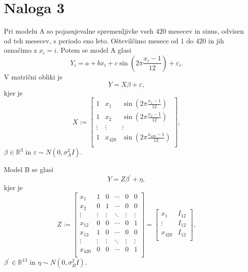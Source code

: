 \documentclass{article}
\begin{document}
\section*{Naloga 3}
Pri modelu A so pojasnjevalne spremenljivke vseh $420$ mesecev in sinus, odvisen od teh mesecev, s periodo eno leto. Oštevilčimo mesece od $1$ do $420$ in jih označimo z $x_i = i$. Potem se model A glasi
\begin{equation*}
    Y_i = a + b x_i + c \sin \left(2\pi \frac{x_i - 1}{12}\right) + \varepsilon_i.
\end{equation*}
V matrični obliki je
\begin{equation*}
    Y = X \beta + \varepsilon,
\end{equation*}
kjer je
\begin{equation*}
    X := 
    \begin{bmatrix}
        1 & x_1 & \sin \left(2\pi \frac{x_1 - 1}{12}\right) \\
        1 & x_2 & \sin \left(2\pi \frac{x_2 - 1}{12}\right) \\
        \vdots & \vdots & \vdots \\
        1 & x_{420} & \sin \left(2\pi \frac{x_{420} - 1}{12}\right) \\
    \end{bmatrix},
\end{equation*}
$\beta \in \mathbb{R}^3$ in $\varepsilon \sim N \left(0, \sigma_A^2 I\right)$.

Model B se glasi
\begin{equation*}
    Y = Z \beta^\prime + \eta,
\end{equation*}
kjer je
\begin{equation*}
    Z :=
    \begin{bmatrix}
        x_1 & 1 & 0 & \cdots & 0 & 0 \\
        x_2 & 0 & 1 & \cdots & 0 & 0 \\
        \vdots & \vdots & \vdots & \ddots & \vdots & \vdots \\
        x_{12} & 0 & 0 & \cdots & 0 & 1 \\
        x_{13} & 1 & 0 & \cdots & 0 & 0 \\
        \vdots & \vdots & \vdots & \ddots & \vdots & \vdots \\
        x_{420} & 0 & 0 & \cdots & 0 & 1 \\
    \end{bmatrix}
    =
    \begin{bmatrix}
        x_1  & I_{12} \\
        \vdots &I_{12} \\
        x_{420}  & I_{12} \\
    \end{bmatrix},
\end{equation*}
$\beta^\prime \in \mathbb{R}^{13}$ in $\eta \sim N\left(0, \sigma_B^2 I\right)$.
\end{document}
